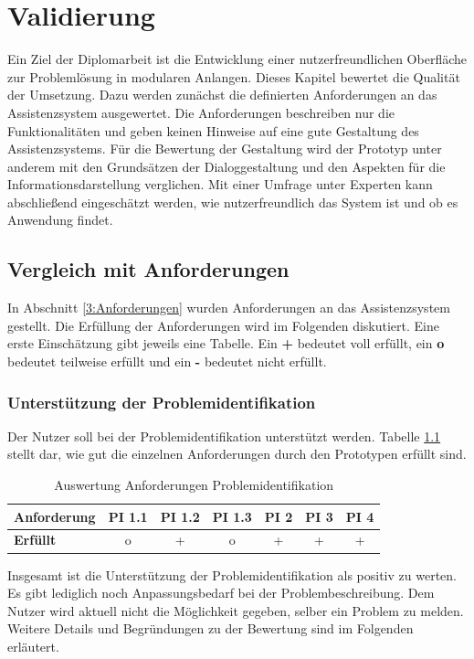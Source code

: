 \chapter{Validierung}
\label{Validierung}

Ein Ziel der Diplomarbeit ist die Entwicklung einer nutzerfreundlichen Oberfläche zur Problemlösung in modularen Anlangen. Dieses Kapitel bewertet die Qualität der Umsetzung. Dazu werden zunächst die definierten Anforderungen an das Assistenzsystem ausgewertet. Die Anforderungen beschreiben nur die Funktionalitäten und geben keinen Hinweise auf eine gute Gestaltung des Assistenzsystems. Für die Bewertung der Gestaltung wird der Prototyp unter anderem mit den Grundsätzen der Dialoggestaltung und den Aspekten für die Informationsdarstellung verglichen. Mit einer Umfrage unter Experten kann abschließend eingeschätzt werden, wie nutzerfreundlich das System ist und ob es Anwendung findet.

\section{Vergleich mit Anforderungen}
In Abschnitt \ref{3:Anforderungen} wurden Anforderungen an das Assistenzsystem gestellt. Die Erfüllung der Anforderungen wird im Folgenden diskutiert. Eine erste Einschätzung gibt jeweils eine Tabelle. Ein \textbf{+} bedeutet voll erfüllt, ein \textbf{o} bedeutet teilweise erfüllt und ein \textbf{-} bedeutet nicht erfüllt.

\subsection{Unterstützung der Problemidentifikation}
Der Nutzer soll bei der Problemidentifikation unterstützt werden. Tabelle \ref{tab:Anforderungen-Problemidentifikation} stellt dar, wie gut die einzelnen Anforderungen durch den Prototypen erfüllt sind.
\begin{table}[htbp]
\caption{Auswertung Anforderungen Problemidentifikation}
\centering
\begin{tabular}{l|c|c|c|c|c|c}
\textbf{Anforderung} & PI 1.1 & PI 1.2 & PI 1.3 & PI 2 & PI 3 & PI 4 \\
\hline
\textbf{Erfüllt} & o & + & o & + & + & + \\
\end{tabular}
\label{tab:Anforderungen-Problemidentifikation}
\end{table}

Insgesamt ist die Unterstützung der Problemidentifikation als positiv zu werten. Es gibt lediglich noch Anpassungsbedarf bei der Problembeschreibung. Dem Nutzer wird aktuell nicht die Möglichkeit gegeben, selber ein Problem zu melden. Weitere Details und Begründungen zu der Bewertung sind im Folgenden erläutert.


